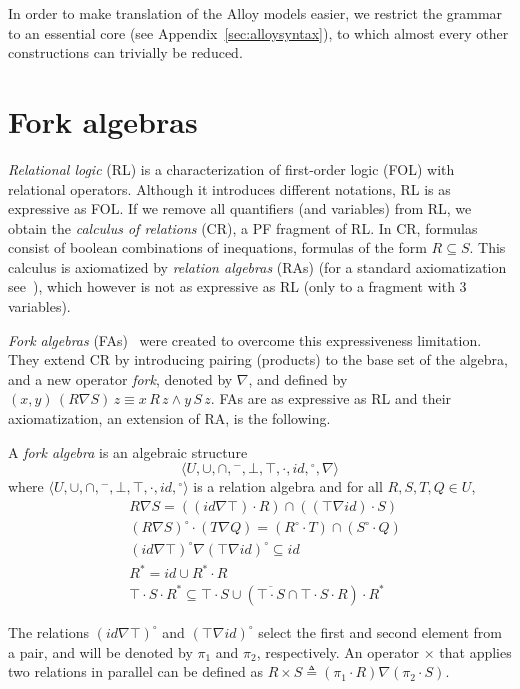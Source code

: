 \documentclass{llncs}
\begin{document}
In order to make translation of the Alloy models easier, we restrict
the grammar to an essential core (see Appendix~\ref{sec:alloysyntax}), to
which almost every other constructions can trivially be reduced.

\section{Fork algebras}
\label{sec:fork}
\emph{Relational logic} (RL) is a characterization of first-order logic (FOL) with relational operators. Although it introduces different notations, RL is as expressive as FOL. If we remove all quantifiers (and variables) from RL, we obtain the \emph{calculus of relations} (CR), a PF fragment of RL. In CR, formulas consist of boolean combinations of inequations, formulas of the form $R \subseteq S$. This calculus is axiomatized by \emph{relation algebras} (RAs) (for a standard axiomatization see~\cite{maddux}), which however is not as expressive as RL (only to a fragment with 3 variables).

\emph{Fork algebras} (FAs)~\cite{forkb} were created to overcome this
expressiveness limitation. They extend CR by introducing pairing
(products) to the base set of the algebra, and a new operator
\emph{fork}, denoted by $\nabla$, and defined by $(x,y) \, (R \nabla S) \, z \equiv x \, R \, z \wedge y \, S \, z$.
FAs are as expressive as RL and their axiomatization, an extension of RA, is the following.

\begin{definition}
A \emph{fork algebra} is an algebraic structure 
\begin{equation*}
\langle U, \cup, \cap, {}^{-}, \bot, \top, \cdot , id, {}^\circ, \nabla \rangle
\end{equation*}
where $\langle U, \cup, \cap, {}^{-}, \bot, \top, \cdot, id, {}^\circ \rangle$ is a relation algebra and for all $R, S, T, Q \in U$,
\begin{align*}
&R \nabla S = ((id \nabla \top) \cdot R) \cap ((\top \nabla id) \cdot S) \\ &(R \nabla S)^\circ \cdot (T \nabla Q) = (R^\circ \cdot T) \cap (S^\circ \cdot Q) \\ &(id \nabla \top)^\circ \nabla (\top \nabla id)^\circ \subseteq id \\ & R^* = id \cup R^* \cdot R \\
& \top \cdot S \cdot R^* \subseteq \top \cdot S \cup (\overline{\top \cdot S} \cap \top \cdot S \cdot R) \cdot R^*
\end{align*}
\label{def:afa}
\end{definition}
The relations $(id \nabla \top)^\circ$ and $(\top \nabla id)^\circ$ select
the first and second element from a pair, and will be denoted by
$\pi_1$ and $\pi_2$, respectively. An operator $\times$ that applies
two relations in parallel can be defined as $R \times S \triangleq (\pi_1 \cdot R) \nabla (\pi_2 \cdot S)$.
\end{document}
